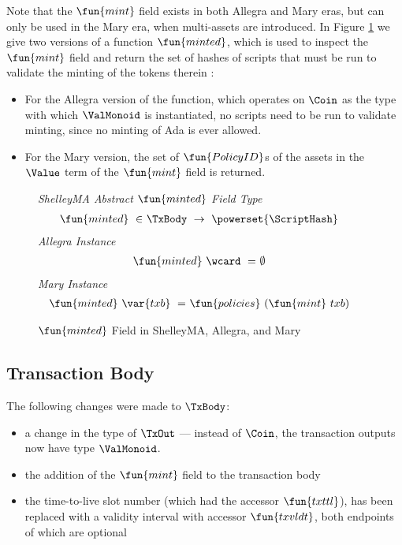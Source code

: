 Note that the $\fun{mint}$ field exists in both Allegra and Mary eras,
but can only be used in the Mary era, when multi-assets are introduced.
In Figure \ref{fig:minted} we give two versions of a function $\fun{minted}$,
which is used to inspect the $\fun{mint}$ field and return the set of hashes
of scripts that must be run to validate the minting of the tokens therein :

\begin{itemize}
  \item For the Allegra version of the function, which operates on $\Coin$ as the
  type with which $\ValMonoid$ is instantiated, no scripts need to be run
  to validate minting, since no minting of Ada is ever allowed.

  \item For the Mary version, the set of $\fun{PolicyID}$s of the
  assets in the $\Value$ term of the $\fun{mint}$ field is returned.
\end{itemize}

\begin{figure*}[t!]
  \emph{ShelleyMA Abstract $\fun{minted}$ Field Type}
  \begin{align*}
    \fun{minted}~\in&~ \TxBody~\to~\powerset{\ScriptHash}
  \end{align*}
  \emph{Allegra Instance}
  \begin{align*}
    \fun{minted}~\wcard~=&~ \emptyset
  \end{align*}
  \emph{Mary Instance}
  \begin{align*}
    \fun{minted}~\var{txb}~=&~ \fun{policies}~(\fun{mint}~{txb})
  \end{align*}
  \caption{$\fun{minted}$ Field in ShelleyMA, Allegra, and Mary}
  \label{fig:minted}
\end{figure*}

\subsection*{Transaction Body}

The following changes were made to $\TxBody$:

\begin{itemize}
  \item a change in the type of $\TxOut$ --- instead of
$\Coin$, the transaction outputs now have type $\ValMonoid$.
  \item the addition of the $\fun{mint}$ field to the transaction body
  \item the time-to-live slot number (which had the accessor $\fun{txttl}$),
  has been replaced with a validity interval with accessor $\fun{txvldt}$,
  both endpoints of which are optional
\end{itemize}

